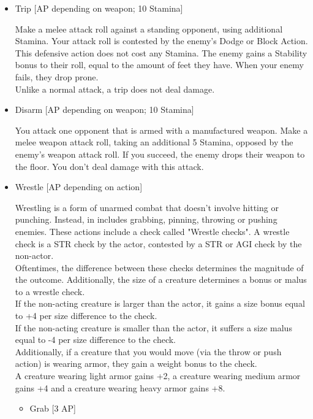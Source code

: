 \begin{itemize}
\item Trip [AP depending on weapon; 10 Stamina]

Make a melee attack roll against a standing opponent, using additional Stamina.
Your attack roll is contested by the enemy's Dodge or Block Action.
This defensive action does not cost any Stamina.
The enemy gains a Stability bonus to their roll, equal to the amount of feet they have.
When your enemy fails, they drop prone.\\
Unlike a normal attack, a trip does not deal damage.\\

\item Disarm [AP depending on weapon; 10 Stamina]

You attack one opponent that is armed with a manufactured weapon.
Make a melee weapon attack roll, taking an additional 5 Stamina, opposed by the enemy's weapon attack roll.
If you succeed, the enemy drops their weapon to the floor.
You don't deal damage with this attack.\\

\item Wrestle [AP depending on action]

    Wrestling is a form of unarmed combat that doesn't involve hitting or punching.
    Instead, in includes grabbing, pinning, throwing or pushing enemies.
    These actions include a check called "Wrestle checks".
    A wrestle check is a STR check by the actor, contested by a STR or AGI check by the non-actor.\\
    Oftentimes, the difference between these checks determines the magnitude of the outcome.
    Additionally, the size of a creature determines a bonus or malus to a wrestle check.\\
    If the non-acting creature is larger than the actor, it gains a size bonus equal to +4 per size difference to the check.\\
    If the non-acting creature is smaller than the actor, it suffers a size malus equal to -4 per size difference to the check.\\
    Additionally, if a creature that you would move (via the throw or push action) is wearing armor, they gain a weight bonus to the check.\\
    A creature wearing light armor gains +2, a creature wearing medium armor gains +4 and a creature wearing heavy armor gains +8.

    \begin{itemize}
    \item Grab [3 AP]


\end{itemize}
\end{itemize}
